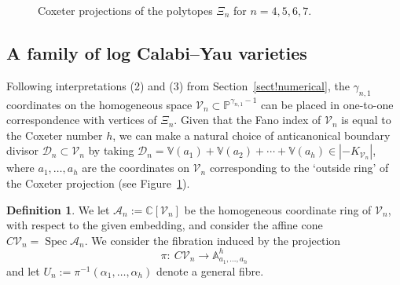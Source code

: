 \documentclass[pdftex]{sigma}
\numberwithin{equation}{section}
\theoremstyle{definition}
\newtheorem{defn}[thm]{Definition}
\newcommand{\Aa}{\mathbb{A}}
\newcommand{\CC}{\mathbb{C}}
\newcommand{\VV}{\mathbb{V}}
\DeclareMathOperator{\Spec}{Spec}
\begin{document}
\begin{figure}[ht!]
\caption{Coxeter projections of the polytopes $\Xi_n$ for $n=4,5,6,7$.}\label{fig!polytopes}
\end{figure}

\subsection{A family of log Calabi--Yau varieties}
Following interpretations (2) and (3) from Section~\ref{sect!numerical}, the $\gamma_{n,1}$ coordinates on the homogeneous space $\mathcal V_n\subset \mathbb{P}^{\gamma_{n,1}-1}$ can be placed in one-to-one correspondence with vertices of $\Xi_n$. Given that the Fano index of $\mathcal V_n$ is equal to the Coxeter number $h$, we can make a natural choice of anticanonical boundary divisor $\mathcal D_n\subset \mathcal V_n$ by taking
$\mathcal D_n = \VV(a_1) + \VV(a_2) + \cdots + \VV(a_h) \in |{-K_{\mathcal V_n}}|$,
where $a_1,\ldots,a_h$ are the coordinates on $\mathcal V_n$ corresponding to the `outside ring' of the Coxeter projection (see Figure~\ref{fig!polytopes}).

\begin{defn}
We let $\mathcal A_n := \CC[\mathcal V_n]$ be the homogeneous coordinate ring of $\mathcal V_n$, with respect to the given embedding, and consider the affine cone $C\mathcal V_n = \Spec \mathcal A_n$. We consider the fibration induced by the projection
\[ \pi\colon\ C\mathcal V_n \to \Aa^{h}_{a_1,\ldots,a_{h}}\]
and let $U_n := \pi^{-1}(\alpha_1, \ldots, \alpha_h)$ denote a general fibre.
\end{defn}
\end{document}
